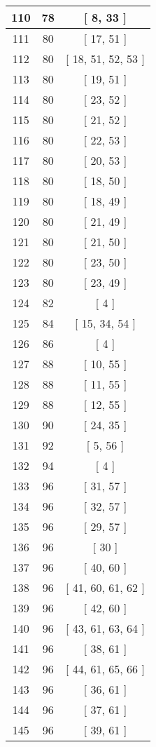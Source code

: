 \begin{center}
\begin{longtable}[H]{|| c c c ||}
\hline
110 & 78 & [ 8, 33 ] \\ 
\hline
111 & 80 & [ 17, 51 ] \\ 
\hline
112 & 80 & [ 18, 51, 52, 53 ] \\ 
\hline
113 & 80 & [ 19, 51 ] \\ 
\hline
114 & 80 & [ 23, 52 ] \\ 
\hline
115 & 80 & [ 21, 52 ] \\ 
\hline
116 & 80 & [ 22, 53 ] \\ 
\hline
117 & 80 & [ 20, 53 ] \\ 
\hline
118 & 80 & [ 18, 50 ] \\ 
\hline
119 & 80 & [ 18, 49 ] \\ 
\hline
120 & 80 & [ 21, 49 ] \\ 
\hline
121 & 80 & [ 21, 50 ] \\ 
\hline
122 & 80 & [ 23, 50 ] \\ 
\hline
123 & 80 & [ 23, 49 ] \\ 
\hline
124 & 82 & [ 4 ] \\ 
\hline
125 & 84 & [ 15, 34, 54 ] \\ 
\hline
126 & 86 & [ 4 ] \\ 
\hline
127 & 88 & [ 10, 55 ] \\ 
\hline
128 & 88 & [ 11, 55 ] \\ 
\hline
129 & 88 & [ 12, 55 ] \\ 
\hline
130 & 90 & [ 24, 35 ] \\ 
\hline
131 & 92 & [ 5, 56 ] \\ 
\hline
132 & 94 & [ 4 ] \\ 
\hline
133 & 96 & [ 31, 57 ] \\ 
\hline
134 & 96 & [ 32, 57 ] \\ 
\hline
135 & 96 & [ 29, 57 ] \\ 
\hline
136 & 96 & [ 30 ] \\ 
\hline
137 & 96 & [ 40, 60 ] \\ 
\hline
138 & 96 & [ 41, 60, 61, 62 ] \\ 
\hline
139 & 96 & [ 42, 60 ] \\ 
\hline
140 & 96 & [ 43, 61, 63, 64 ] \\ 
\hline
141 & 96 & [ 38, 61 ] \\ 
\hline
142 & 96 & [ 44, 61, 65, 66 ] \\ 
\hline
143 & 96 & [ 36, 61 ] \\ 
\hline
144 & 96 & [ 37, 61 ] \\ 
\hline
145 & 96 & [ 39, 61 ] \\ 

\end{longtable}
\end{center}
